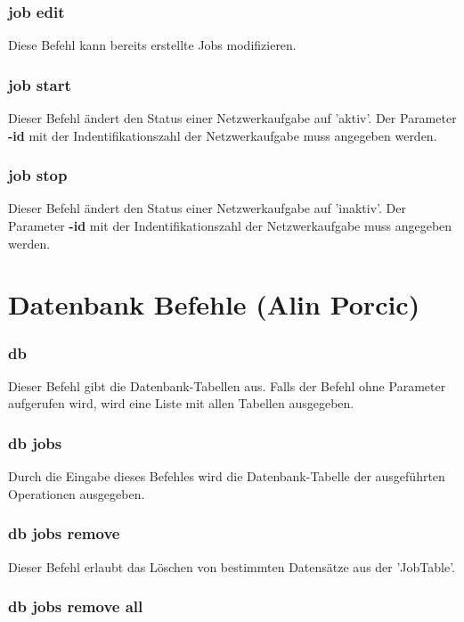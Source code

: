 \documentclass[12pt,a4paper]{report}
\begin{document}
\begin{onehalfspace}
\subsubsection{job edit}

Diese Befehl kann bereits erstellte Jobs modifizieren. 

\subsubsection{job start}

Dieser Befehl ändert den Status einer Netzwerkaufgabe auf 'aktiv'. Der Parameter \textbf{-id} mit der Indentifikationszahl der Netzwerkaufgabe muss angegeben werden.

\subsubsection{job stop}

Dieser Befehl ändert den Status einer Netzwerkaufgabe auf 'inaktiv'. Der Parameter \textbf{-id} mit der Indentifikationszahl der Netzwerkaufgabe muss angegeben werden.

\section{Datenbank Befehle (Alin Porcic)}

\subsubsection{db}

Dieser Befehl gibt die Datenbank-Tabellen aus. Falls der Befehl ohne Parameter aufgerufen wird, wird eine Liste mit allen Tabellen ausgegeben.

\subsubsection{db jobs}

Durch die Eingabe dieses Befehles wird die Datenbank-Tabelle der ausgeführten Operationen ausgegeben.

\subsubsection{db jobs remove}

Dieser Befehl erlaubt das Löschen von bestimmten Datensätze aus der 'JobTable'.

\subsubsection{db jobs remove all}


\end{onehalfspace}
\end{document}
